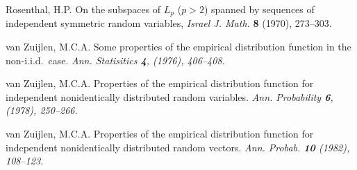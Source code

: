 \documentclass[12pt]{amsart}
\begin{document}
\begin{thebibliography}{999}
 Rosenthal, H.P. On the subspaces of $L_p$ 
($p > 2$) spanned by
sequences of independent symmetric random variables, {\em Israel
J. Math.} {\bf 8} (1970), 273--303.

van Zuijlen, M.C.A. 
Some properties of the empirical distribution function in the non-i.i.d.\
case.
{\em Ann. Statisitics {\bf 4}, (1976), 406--408.}

van Zuijlen, M.C.A. 
Properties of the empirical distribution function for independent 
nonidentically distributed random variables.
{\em Ann. Probability {\bf 6}, (1978), 250--266.}

van Zuijlen, M.C.A. 
Properties of the empirical distribution function for independent 
nonidentically distributed random vectors. 
{\em Ann. Probab. {\bf 10} (1982), 108--123.}

\end{thebibliography}
\end{document}
